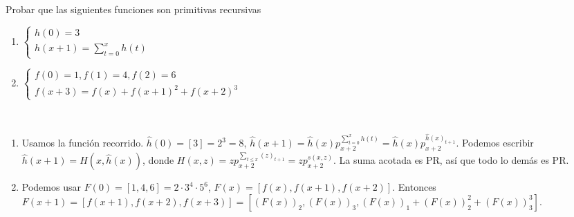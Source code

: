 \documentclass[twoside]{article}
\begin{document}
\begin{ejercicio}{19}
Probar que las siguientes funciones son primitivas recursivas
\begin{enumerate}
\item $\begin{cases}
h(0) = 3\\
h(x + 1) =\sum_{t=0}^x h(t)
\end{cases}$

\item $\begin{cases}
f(0) = 1, f(1) = 4, f(2) = 6\\
f(x + 3) = f(x) + f(x + 1)^2 + f(x + 2)^3
\end{cases}$
\end{enumerate}
\end{ejercicio}
\begin{solucion}\
\begin{enumerate}
\item Usamos la función recorrido. $\hat{h}(0)=[3]=2^3=8$, $\hat{h}(x+1)=\hat{h}(x)p_{x+2}^{\sum_{t=0}^xh(t)}=\hat{h}(x)p_{x+2}^{\hat{h}(x)_{t+1}}$. Podemos escribir $\hat{h}(x+1)=H(x,\hat{h}(x))$, donde $H(x,z)=zp_{x+2}^{\sum_{t\leq x} (z)_{t+1}}=zp_{x+2}^{s(x,z)}$. La suma acotada es PR, así que todo lo demás es PR.
\item Podemos usar $F(0)=[1,4,6]=2\cdot 3^4\cdot 5^6$, $F(x)=[f(x),f(x+1),f(x+2)]$. Entonces $F(x+1)=[f(x+1),f(x+2),f(x+3)]=[(F(x))_2,(F(x))_3,(F(x))_1+(F(x))_2^2+(F(x))_3^3]$. 
\end{enumerate}
\end{solucion}

\newpage
\end{document}
